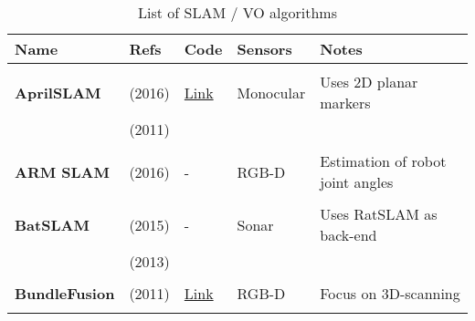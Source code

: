 \documentclass[a4paper,12pt]{scrartcl}
\begin{document}
{\footnotesize
\begin{longtable}{l|l|l|l|l}
  \caption{List of SLAM / VO algorithms}\\[2mm]
  \label{tab:list_found_slam_algorithms}
  \textbf{Name}            & \textbf{Refs}                     & \textbf{Code}                                                      & \textbf{Sensors}  & \textbf{Notes}\\
    \hline
    &                                   &                                                                    &                       &\\
    \textbf{AprilSLAM}     & \cite{Wang2016} (2016)            & \href{https://github.com/ProjectArtemis/aprilslam}{Link}           & Monocular             & Uses 2D planar markers\\
                           & \cite{Olson2011} (2011)           &                                                                    &                       &\\
                           &                                   &                                                                    &                       &\\
    \textbf{ARM SLAM}      & \cite{Klingensmith2016} (2016)    & -                                                                  & RGB-D                 & Estimation of robot joint angles\\
                           &                                   &                                                                    &                       &\\
    \textbf{BatSLAM}       & \cite{Steckel2015} (2015)         & -                                                                  & Sonar                 & Uses RatSLAM as back-end\\
                           & \cite{Steckel2013} (2013)         &                                                                    &                       &\\
                           &                                   &                                                                    &                       &\\
    \textbf{BundleFusion}  & \cite{Dai2017} (2011)             & {\href{https://github.com/niessner/BundleFusion}{Link}}            & RGB-D                 & Focus on 3D-scanning\\
                           &                                   &                                                                    &                       &\\

\end{longtable}}
\end{document}
